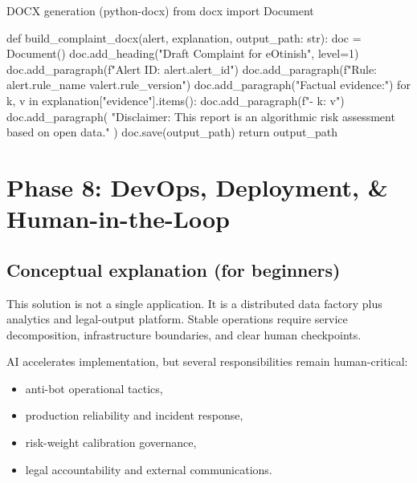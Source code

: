 \documentclass[11pt,a4paper]{article}
\begin{document}
\begin{codeblock}[language=Python]{DOCX generation (python-docx)}
from docx import Document

def build_complaint_docx(alert, explanation, output_path: str):
    doc = Document()
    doc.add_heading("Draft Complaint for eOtinish", level=1)
    doc.add_paragraph(f"Alert ID: {alert.alert_id}")
    doc.add_paragraph(f"Rule: {alert.rule_name} v{alert.rule_version}")
    doc.add_paragraph("Factual evidence:")
    for k, v in explanation["evidence"].items():
        doc.add_paragraph(f"- {k}: {v}")
    doc.add_paragraph(
      "Disclaimer: This report is an algorithmic risk assessment based on open data."
    )
    doc.save(output_path)
    return output_path
\end{codeblock}

\section{Phase 8: DevOps, Deployment, \& Human-in-the-Loop}

\subsection{Conceptual explanation (for beginners)}
\begin{conceptbox}
This solution is not a single application. It is a distributed data factory plus analytics and legal-output platform. Stable operations require service decomposition, infrastructure boundaries, and clear human checkpoints.

AI accelerates implementation, but several responsibilities remain human-critical:
\begin{itemize}[leftmargin=1.4em]
  \item anti-bot operational tactics,
  \item production reliability and incident response,
  \item risk-weight calibration governance,
  \item legal accountability and external communications.
\end{itemize}
\end{conceptbox}
\end{document}
